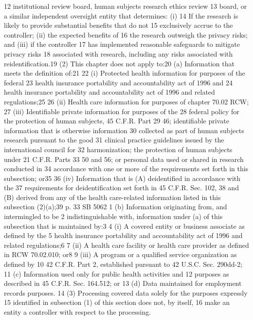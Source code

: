 12 institutional review board, human subjects research ethics review
13 board, or a similar independent oversight entity that determines: (i)
14 If the research is likely to provide substantial benefits that do not
15 exclusively accrue to the controller; (ii) the expected benefits of
16 the research outweigh the privacy risks; and (iii) if the controller
17 has implemented reasonable safeguards to mitigate privacy risks
18 associated with research, including any risks associated with
reidentification.19
(2) This chapter does not apply to:20
(a) Information that meets the definition of:21
22 (i) Protected health information for purposes of the federal
23 health insurance portability and accountability act of 1996 and
24 health insurance portability and accountability act of 1996 and
related regulations;25
26 (ii) Health care information for purposes of chapter 70.02 RCW;
27 (iii) Identifiable private information for purposes of the
28 federal policy for the protection of human subjects, 45 C.F.R. Part
29 46; identifiable private information that is otherwise information
30 collected as part of human subjects research pursuant to the good
31 clinical practice guidelines issued by the international council for
32 harmonization; the protection of human subjects under 21 C.F.R. Parts
33 50 and 56; or personal data used or shared in research conducted in
34 accordance with one or more of the requirements set forth in this
subsection; or35
36 (iv) Information that is (A) deidentified in accordance with the
37 requirements for deidentification set forth in 45 C.F.R. Sec. 102,
38 and (B) derived from any of the health care-related information
listed in this subsection (2)(a);39
p. 33 SB 5062
1 (b) Information originating from, and intermingled to be
2 indistinguishable with, information under (a) of this subsection that
is maintained by:3
4 (i) A covered entity or business associate as defined by the
5 health insurance portability and accountability act of 1996 and
related regulations;6
7 (ii) A health care facility or health care provider as defined in
RCW 70.02.010; or8
9 (iii) A program or a qualified service organization as defined by
10 42 C.F.R. Part 2, established pursuant to 42 U.S.C. Sec. 290dd-2;
11 (c) Information used only for public health activities and
12 purposes as described in 45 C.F.R. Sec. 164.512; or
13 (d) Data maintained for employment records purposes.
14 (3) Processing covered data solely for the purposes expressly
15 identified in subsection (1) of this section does not, by itself,
16 make an entity a controller with respect to the processing.
